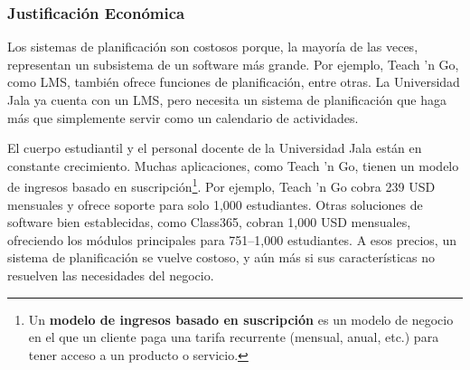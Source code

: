 \subsubsection{Justificación Económica}
Los sistemas de planificación son costosos porque, la mayoría de las veces, representan un subsistema de un software más grande.
Por ejemplo, Teach 'n Go, como LMS, también ofrece funciones de planificación, entre otras.
La Universidad Jala ya cuenta con un LMS, pero necesita un sistema de planificación que haga más que simplemente servir como un calendario de actividades.

El cuerpo estudiantil y el personal docente de la Universidad Jala están en constante crecimiento.
Muchas aplicaciones, como Teach 'n Go, tienen un modelo de ingresos basado en suscripción\footnote{Un \textbf{modelo de ingresos basado en suscripción} es un modelo de negocio en el que un cliente paga una tarifa recurrente (mensual, anual, etc.) para tener acceso a un producto o servicio.}.
Por ejemplo, Teach 'n Go cobra 239 USD mensuales y ofrece soporte para solo 1,000 estudiantes.
Otras soluciones de software bien establecidas, como Class365, cobran 1,000 USD mensuales, ofreciendo los módulos principales para 751–1,000 estudiantes.
A esos precios, un sistema de planificación se vuelve costoso, y aún más si sus características no resuelven las necesidades del negocio.
